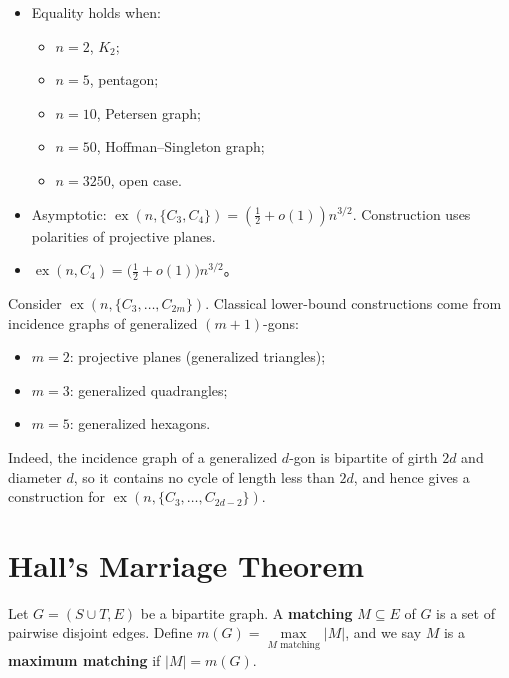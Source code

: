 \documentclass[11pt, a4paper]{ctexrep}
\begin{document}
\begin{remark}\leavevmode
    \begin{itemize}
        \item Equality holds when:
              \begin{itemize}
                  \item $n=2$, $K_2$;
                  \item $n=5$, pentagon;
                  \item $n=10$, Petersen graph;
                  \item $n=50$, Hoffman--Singleton graph;
                  \item $n=3250$, open case.
              \end{itemize}
        \item Asymptotic: $\operatorname{ex}(n,\{C_3,C_4\})=(\frac{1}{2}+o(1))n^{3/2}$. Construction uses polarities of projective planes.
        \item $\operatorname{ex}(n,C_4)=\bigl(\frac{1}{2}+o(1)\bigr)n^{3/2}$。
    \end{itemize}
\end{remark}

\begin{remark}
    Consider $\operatorname{ex}(n,\{C_3,\ldots,C_{2m}\})$.
    Classical lower-bound constructions come from incidence graphs of generalized $(m+1)$-gons:
    \begin{itemize}
        \item $m=2$: projective planes (generalized triangles);
        \item $m=3$: generalized quadrangles;
        \item $m=5$: generalized hexagons.
    \end{itemize}
    Indeed, the incidence graph of a generalized $d$-gon is bipartite of girth $2d$ and diameter $d$,
    so it contains no cycle of length less than $2d$, and hence gives a construction for
    $\operatorname{ex}(n,\{C_3,\ldots,C_{2d-2}\})$.
\end{remark}

\section{Hall's Marriage Theorem}

\begin{definition}
    Let $G=(S\cup T,E)$ be a bipartite graph.
    A \textbf{matching} $M\subseteq E$ of $G$ is a set of pairwise disjoint edges.
    Define $m(G)=\max\limits_{M\text{ matching}}|M|$, and we say $M$ is a \textbf{maximum matching} if $|M|=m(G)$.
\end{definition}
\end{document}
